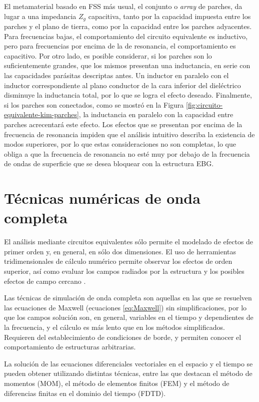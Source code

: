 El metamaterial basado en FSS más usual, el conjunto o \textit{array} de parches, da lugar a una impedancia $Z_g$ capacitiva, tanto por la capacidad impuesta entre los parches y el plano de tierra, como por la capacidad entre los parches adyacentes. Para frecuencias bajas, el comportamiento del circuito equivalente es inductivo, pero para frecuencias por encima de la de resonancia, el comportamiento es capacitivo. Por otro lado, es posible considerar, si los parches son lo suficientemente grandes, que los mismos presentan una inductancia, en serie con las capacidades parásitas descriptas antes. Un inductor en paralelo con el inductor correspondiente al plano conductor de la cara inferior del dieléctrico disminuye la inductancia total, por lo que se logra el efecto deseado. Finalmente, si los parches son conectados, como se mostró en la Figura \ref{fig:circuito-equivalente-kim-parches}, la inductancia en paralelo con la capacidad entre parches acrecentará este efecto. Los efectos que se presentan por encima de la frecuencia de resonancia impiden que el análisis intuitivo describa la existencia de modos superiores, por lo que estas consideraciones no son completas, lo que obliga a que la frecuencia de resonancia no esté muy por debajo de la frecuencia de ondas de superficie que se desea bloquear con la estructura EBG.

\section{Técnicas numéricas de onda completa}
\label{sec_estructuras_periodicas}

El análisis mediante circuitos equivalentes sólo permite el modelado de efectos de primer orden y, en general, en sólo dos dimensiones. El uso de herramientas tridimensionales de cálculo numérico permite observar los efectos de orden superior, así como evaluar los campos radiados por la estructura y los posibles efectos de campo cercano \cite{Mohajer:SupressionBand}.

Las técnicas de simulación de onda completa son aquellas en las que se resuelven las ecuaciones de Maxwell (ecuaciones \ref{eq:Maxwell}) sin simplificaciones, por lo que los campos solución son, en general, variables en el tiempo y dependientes de la frecuencia, y el cálculo es más lento que en los métodos simplificados. Requieren del establecimiento de condiciones de borde, y permiten conocer el comportamiento de estructuras arbitrarias.

La solución de las ecuaciones diferenciales vectoriales en el espacio y el tiempo se pueden obtener utilizando distintas técnicas, entre las que destacan el método de momentos (MOM), el método de elementos finitos (FEM) y el método de diferencias finitas en el dominio del tiempo (FDTD).

